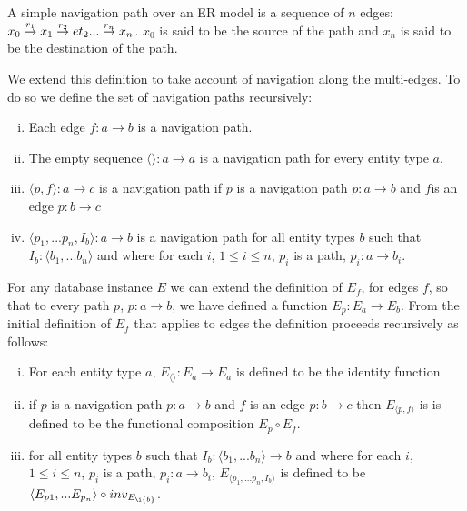 \documentclass[10pt,a4paper]{article}
\begin{document}
\noindent A simple navigation path over an ER model  is a
sequence of  $n$ edges:
$\overset{r_1}{x_0 \rightarrow   x_1} \overset{r_2}{\rightarrow} et_2 ... \overset{r_n}{\rightarrow} x_n$.  $x_0$ is said to be the source of the path and $x_n$ is said to be the destination of the path. 

\noindent We extend this definition to take account of navigation along the multi-edges. To do so we define the set of navigation paths recursively:

\begin{enumerate} [(i)]
\item{ Each edge $f: a \rightarrow b$ is a navigation path.
}
\item{ The empty sequence  $\langle \rangle : a \rightarrow a$ is a navigation path for every entity type $a$.
}
\item{ $\langle p,f \rangle : a \rightarrow c$ is a navigation path  if $p$ is a navigation path $p: a \rightarrow b$ and $f $is an edge $p: b \rightarrow c$
}
\item{ $\langle p_1,...p_n,I_b\rangle : a \rightarrow b$ is a navigation path for all entity types $b$ such that $I_b: \langle b_1,...b_n\rangle$ and where
for each $i$, $1 \leq i \leq n$, $p_i$ is a path, $p_i: a \rightarrow b_i$.   
}
\end{enumerate}

\noindent For any database instance $E$ we can  extend  the definition of
$E_f$, for edges $f$,  so that to every path $p$, $p: a \rightarrow b$,  we have defined a function $E_p: E_a \rightarrow E_b$. From the initial definition of $E_f$ that applies to 
edges the definition proceeds recursively as follows: 
\begin{enumerate} [(i)]
\item{  For each entity type $a$, $E_{\langle \rangle}: E_a \rightarrow E_a$ is defined to be the identity function.
}

\item{   if $p$ is a navigation path $p: a \rightarrow b$ and $f$ is an edge $p: b \rightarrow c$ then $E_{\langle p,f \rangle}$ is 
is defined to be the functional composition $E_p \circ E_f$.
}

\item{ for all entity types $b$ such that $I_b: \langle b_1,...b_n\rangle \rightarrow b$ and where
for each $i$, $1 \leq i \leq n$, $p_i$ is a path, $p_i: a \rightarrow b_i$, $E_{\langle p_1,...p_n,I_b\rangle}$ is defined to be 
$\langle E_{p1},...E_{p_n} \rangle \circ inv_{E_{\i{b}}}$.
}
\end{enumerate}
\end{document}
